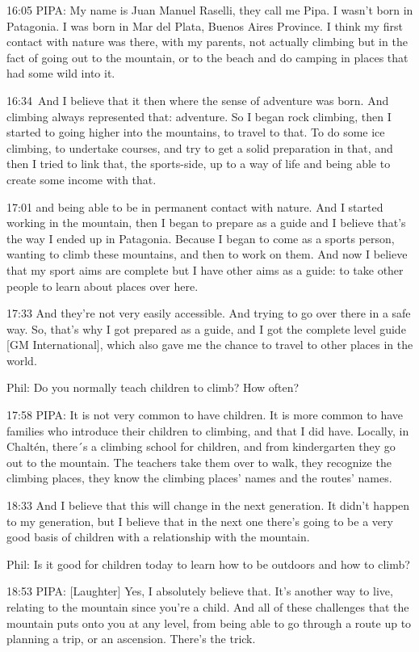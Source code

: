16:05 PIPA: My name is Juan Manuel Raselli, they call me Pipa. I wasn't
born in Patagonia. I was born in Mar del Plata, Buenos Aires Province. I
think my first contact with nature was there, with my parents, not
actually climbing but in the fact of going out to the mountain, or to
the beach and do camping in places that had some wild into it.

16:34~And I believe that it then where the sense of adventure was born.
And climbing always represented that: adventure. So I began rock
climbing, then I started to going higher into the mountains, to travel
to that. To do some ice climbing, to undertake courses, and try to get a
solid preparation in that, and then I tried to link that, the
sports-side, up to a way of life and being able to create some income
with that.

17:01 and being able to be in permanent contact with nature. And I
started working in the mountain, then I began to prepare as a guide and
I believe that's the way I ended up in Patagonia. Because I began to
come as a sports person, wanting to climb these mountains, and then to
work on them. And now I believe that my sport aims are complete but I
have other aims as a guide: to take other people to learn about places
over here.

17:33 And they're not very easily accessible. And trying to go over
there in a safe way. So, that's why I got prepared as a guide, and I got
the complete level guide {[}GM International{]}, which also gave me the
chance to travel to other places in the world.

Phil: Do you normally teach children to climb? How often?

17:58 PIPA: It is not very common to have children. It is more common to
have families who introduce their children to climbing, and that I did
have. Locally, in Chaltén, there´s a climbing school for children, and
from kindergarten they go out to the mountain. The teachers take them
over to walk, they recognize the climbing places, they know the climbing
places' names and the routes' names.

18:33 And I believe that this will change in the next generation. It
didn't happen to my generation, but I believe that in the next one
there's going to be a very good basis of children with a relationship
with the mountain.

Phil: Is it good for children today to learn how to be outdoors and how
to climb?

18:53 PIPA: {[}Laughter{]} Yes, I absolutely believe that. It's another
way to live, relating to the mountain since you're a child. And all of
these challenges that the mountain puts onto you at any level, from
being able to go through a route up to planning a trip, or an ascension.
There's the trick.


